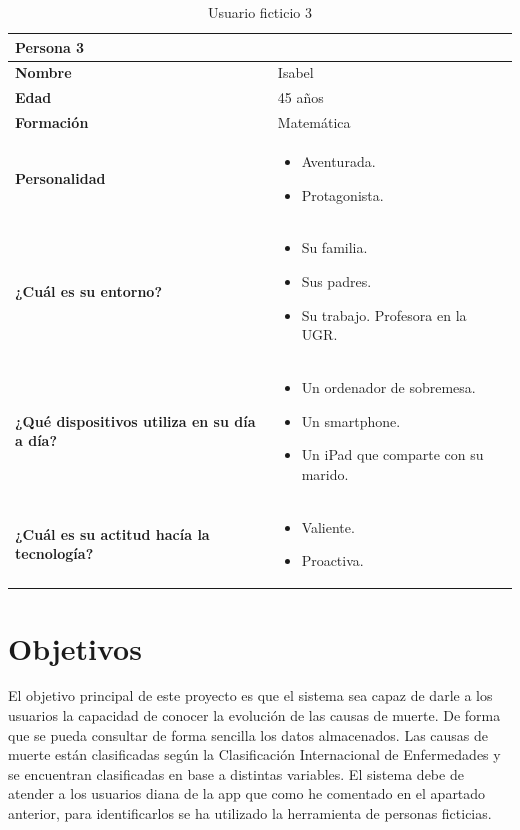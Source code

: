 \begin{table}[H]
	\begin{center}
		\begin{tabular}{| p{} |
                   p{} |}
			\hline
			Persona 3 &  \\ \hline
			\textbf{Nombre} & Isabel \\
			\textbf{Edad} & 45 años \\
			\textbf{Formación} & Matemática \\
			\textbf{Personalidad} & \begin{itemize}
                \item Aventurada.
                \item Protagonista.
            \end{itemize} \\
			\textbf{¿Cuál es su entorno?} & \begin{itemize}
                \item Su familia.
                \item Sus padres.
                \item Su trabajo. Profesora en la UGR.
            \end{itemize} \\
			\textbf{¿Qué dispositivos utiliza en su día a día?} & \begin{itemize}
                \item Un ordenador de sobremesa.
                \item Un smartphone.
                \item Un iPad que comparte con su marido.
            \end{itemize} \\
            \textbf{¿Cuál es su actitud hacía la tecnología?} & \begin{itemize}
                \item Valiente.
                \item Proactiva.
            \end{itemize} \\
            \hline
		\end{tabular}
		\caption{Usuario ficticio 3}
	\end{center}
\end{table}


\section{Objetivos}
\label{sec:obj}
El objetivo principal de este proyecto es que el sistema sea capaz de darle a los usuarios la capacidad de conocer la evolución de las causas de muerte. De forma que se pueda consultar de forma sencilla los datos almacenados. Las causas de muerte están clasificadas según la Clasificación Internacional de Enfermedades y se encuentran clasificadas en base a distintas variables. El sistema debe de atender a los usuarios diana de la app que como he comentado en el apartado anterior, para identificarlos se ha utilizado la herramienta de personas ficticias. 
